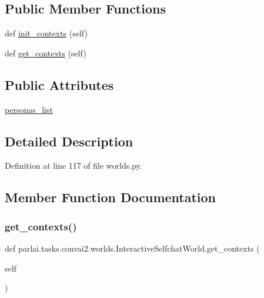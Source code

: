 \subsection*{Public Member Functions}
\begin{DoxyCompactItemize}
\item 
def \hyperlink{classparlai_1_1tasks_1_1convai2_1_1worlds_1_1InteractiveSelfchatWorld_af7524303845371d515ac5ee27a650ce8}{init\+\_\+contexts} (self)
\item 
def \hyperlink{classparlai_1_1tasks_1_1convai2_1_1worlds_1_1InteractiveSelfchatWorld_a3bf4578410c84b762c08cd9e1a8b4549}{get\+\_\+contexts} (self)
\end{DoxyCompactItemize}
\subsection*{Public Attributes}
\begin{DoxyCompactItemize}
\item 
\hyperlink{classparlai_1_1tasks_1_1convai2_1_1worlds_1_1InteractiveSelfchatWorld_aa750cd45fa90b0d961c23e8d25ac5b4a}{personas\+\_\+list}
\end{DoxyCompactItemize}


\subsection{Detailed Description}


Definition at line 117 of file worlds.\+py.



\subsection{Member Function Documentation}
\mbox{\label{classparlai_1_1tasks_1_1convai2_1_1worlds_1_1InteractiveSelfchatWorld_a3bf4578410c84b762c08cd9e1a8b4549}} 
\subsubsection{\texorpdfstring{get\+\_\+contexts()}{get\_contexts()}}
{\footnotesize\ttfamily def parlai.\+tasks.\+convai2.\+worlds.\+Interactive\+Selfchat\+World.\+get\+\_\+contexts (\begin{DoxyParamCaption}\item[{}]{self }\end{DoxyParamCaption})}



